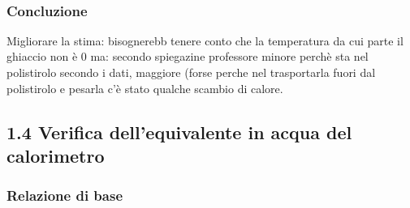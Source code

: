 \documentclass[11pt]{article}
\begin{document}
    \begin{center}
    \end{center}
    { \hspace*{\fill} \\}
    
    \hypertarget{concluzione}{%
\subsubsection{Concluzione}\label{concluzione}}

Migliorare la stima: bisognerebb tenere conto che la temperatura da cui
parte il ghiaccio non è 0 ma: secondo spiegazine professore minore
perchè sta nel polistirolo secondo i dati, maggiore (forse perche nel
trasportarla fuori dal polistirolo e pesarla c'è stato qualche scambio
di calore.

    \hypertarget{verifica-dellequivalente-in-acqua-del-calorimetro}{%
\subsection{1.4 Verifica dell'equivalente in acqua del
calorimetro}\label{verifica-dellequivalente-in-acqua-del-calorimetro}}

\hypertarget{relazione-di-base}{%
\subsubsection{Relazione di base}\label{relazione-di-base}}
\end{document}
